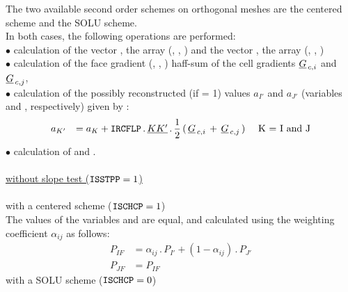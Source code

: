 The two available second order schemes on orthogonal meshes are the centered scheme and the SOLU scheme.
\\ In both cases, the following operations are performed:\\
$\bullet$ calculation of the vector , the array (, , ) and the vector , the array (, , )\\
$\bullet$ calculation of the face gradient (, , )
haff-sum of the cell gradients $\underline{G}_{\,c,i}$ and $\underline{G}_{\,c,j}$,\\
$\bullet$ calculation of the possibly reconstructed (if  = 1) values $a_{I'}$ and  $a_{J'}$ (variables  and , respectively) given by :
\begin{equation}\label{Base_Bilsc2_Eq_Rec_Dif2}
\begin{array}{lll}
a_{K'}&= a_K +  \text{\texttt{IRCFLP}}\,.\,\underline{KK'}\,.\,\displaystyle\frac{1}{2}\,(\,\underline{G}_{\,c,i}\,+\,\underline{G}_{\,c,j}\,)&\text{ K = I and J}\\
\end{array}
\end{equation}
$\bullet$ calculation of  and .\\\\
\hspace*{2cm}{\tiny$\blacksquare$} \underline{ without slope test ($\text{\texttt{ISSTPP}} = 1$)}\\\\
\hspace*{2.5cm}{\tiny$\bigstar$} with a centered scheme ($\text{\texttt{ISCHCP}} = 1$)\\
The values of the variables   and  are equal, and calculated
using the weighting coefficient $\displaystyle\alpha_{ij}$ as follows:
\begin{equation}
\begin{array}{ll}
P_{IF} &=\displaystyle\alpha_{ij}\,.\, P_{I'} + (1 - \displaystyle\alpha_{ij})\,.\, P_{J'}\\
P_{JF} &= P_{IF}
\end{array}
\end{equation}
\hspace*{2.5cm}{\tiny$\bigstar$} with a SOLU scheme ($\text{\texttt{ISCHCP}} = 0$)\\\\
